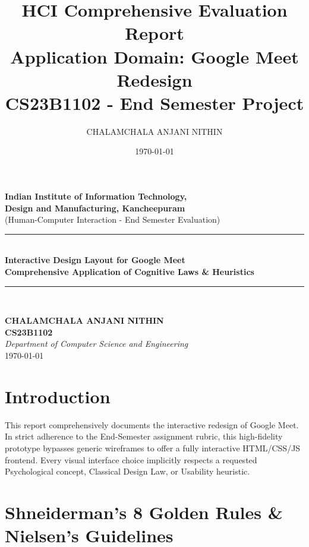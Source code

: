 \documentclass[12pt,a4paper]{article}
\title{\textbf{HCI Comprehensive Evaluation Report}\\
\large Application Domain: Google Meet Redesign\\\small CS23B1102 - End Semester Project}
\author{CHALAMCHALA ANJANI NITHIN}
\date{\today}
\begin{document}
\begin{titlepage}
\begin{center}

{\LARGE \textbf{Indian Institute of Information Technology,\\
Design and Manufacturing, Kancheepuram}}\\[1.5cm]

{\large (Human-Computer Interaction - End Semester Evaluation)}\\[3cm]

\rule{\linewidth}{0.5pt}\\[0.4cm]
{\Huge \textbf{Interactive Design Layout for Google Meet}}\\[0.3cm]
{\Large \textbf{Comprehensive Application of Cognitive Laws \& Heuristics}}\\[0.3cm]
\rule{\linewidth}{0.5pt}\\[2cm]

\vfill

\textbf{CHALAMCHALA ANJANI NITHIN}\\[0.2cm]
\textbf{CS23B1102}\\[0.2cm]
\textit{Department of Computer Science and Engineering}\\[0.5cm]

{\large \today}

\end{center}
\end{titlepage}

\newpage
\tableofcontents
\newpage

\section{Introduction}
This report comprehensively documents the interactive redesign of Google Meet. In strict adherence to the End-Semester assignment rubric, this high-fidelity prototype bypasses generic wireframes to offer a fully interactive HTML/CSS/JS frontend. Every visual interface choice implicitly respects a requested Psychological concept, Classical Design Law, or Usability heuristic.

\section{Shneiderman's 8 Golden Rules \& Nielsen's Guidelines}
\end{document}
